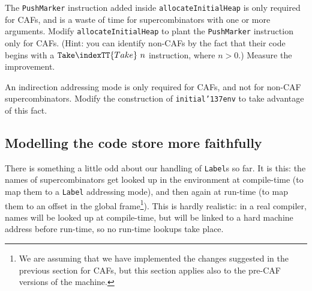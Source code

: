 \begin{exercise}
The \mbox{\tt PushMarker} instruction added inside \mbox{\tt allocateInitialHeap} is only required
for CAFs, and is a waste of time for supercombinators with one or more
arguments.
Modify \mbox{\tt allocateInitialHeap} to plant the \mbox{\tt PushMarker} instruction only for
CAFs. (Hint: you can identify non-CAFs by the fact that their code
begins with a $\mbox{\tt Take}\indexTT{Take}~n$ instruction, where $n>0$.)
Measure the improvement.
\end{exercise}

\begin{exercise}
An indirection addressing mode is only required for CAFs, and not
for non-CAF supercombinators.
Modify the construction of \mbox{\tt initial{\char'137}env} to take advantage of this fact.
\end{exercise}

\subsection{Modelling the code store more faithfully}

There is something a little odd about our handling of \mbox{\tt Label}s so far.
It is this: the names of supercombinators get looked up in the
environment at compile-time (to map them to a \mbox{\tt Label} addressing mode),
and then again at run-time (to map them to an offset in the global
frame\footnote{%
We are assuming that we have implemented the changes suggested in the
previous section for CAFs, but this section applies also to the
pre-CAF versions of the machine.
}).
This is hardly realistic: in a real compiler, names will be looked up
at compile-time, but will be linked to a hard machine address before run-time,
so no run-time lookups take place.

